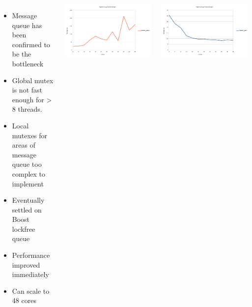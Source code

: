 \documentclass[25pt, portrait,  margin=0mm, innermargin=15mm,
  blockverticalspace=15mm, colspace=15mm, subcolspace=8mm]{tikzposter}
\begin{document}
\begin{columns}
     {
      \begin{itemize}
      \item Message queue has been confirmed to be the bottleneck
      \item Global mutex is not fast enough for > 8 threads.
      \item Local mutexes for areas of message queue too complex to implement
      \item Eventually settled on Boost lockfree queue
      \item Performance improved immediately
      \item Can scale to 48 cores
      \end{itemize}
      \begin{tikzfigure}
        \includegraphics[width=0.95\linewidth]{before.png}
      \end{tikzfigure}
            \begin{tikzfigure}
        \includegraphics[width=0.95\linewidth]{after.png}
      \end{tikzfigure}


}
\end{columns}
\end{document}
